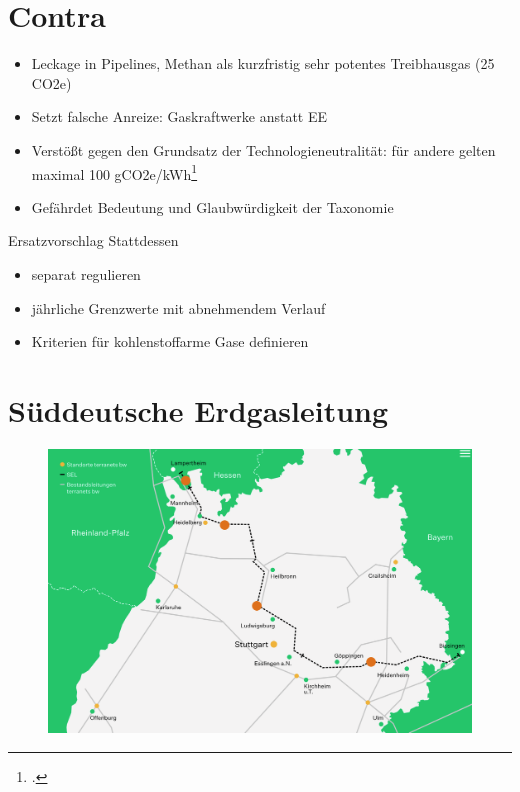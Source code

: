 \documentclass[10pt]{beamer}
\begin{document}
\section{Contra}

\begin{frame}
  \begin{itemize}
    \item Leckage in Pipelines, Methan als kurzfristig sehr potentes Treibhausgas (25 CO2e)
    \item Setzt falsche Anreize: Gaskraftwerke anstatt EE
    \item Verstößt gegen den Grundsatz der Technologieneutralität: für andere gelten maximal 100 gCO2e/kWh\footcite{uba}
    \item Gefährdet Bedeutung und Glaubwürdigkeit der Taxonomie
  \end{itemize}
\end{frame}

\begin{frame}{Ersatzvorschlag}
  Stattdessen
  \begin{itemize}
    \item separat regulieren
    \item jährliche Grenzwerte mit abnehmendem Verlauf
    \item Kriterien für kohlenstoffarme Gase definieren
  \end{itemize}
\end{frame}

\section{Süddeutsche Erdgasleitung}


\begin{frame}
\begin{figure}
\includegraphics[width=\textwidth]{fig/sel.png}

\scriptsize{}
\end{figure}
\end{frame}
\end{document}
